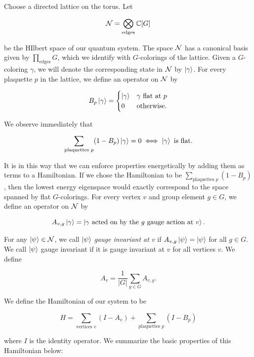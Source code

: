 \documentclass{article}
\theoremstyle{definition}
\numberwithin{figure}{section}
\begin{document}
Choose a directed lattice on the torus. Let

$$\mathcal{N}=\bigotimes_{\text{edges}}\mathbb{C}[G]$$

be the HIlbert space of our quantum system. The space $\mathcal{N}$ has a canonical basis given by $\prod_{\text{edges}}G$, which we  identify with $G$-colorings of the lattice. Given a $G$-coloring $\gamma$, we will denote the corresponding state in $\mathcal{N}$ by $\ket{\gamma}$. For every plaquette $p$ in the lattice, we define an operator on $\mathcal{N}$ by

$$B_p\ket{\gamma}=
\begin{cases}
\ket{\gamma} & \gamma \text{ flat at }p\\
0 & \text{otherwise}.
\end{cases}$$

We observe immediately that

$$\sum_{\text{plaquettes }p}(1-B_p)\ket{\gamma}=0 \iff \ket{\gamma} \text{ is flat.}$$

It is in this way that we can enforce properties energetically by adding them as terms to a Hamiltonian. If we chose the Hamiltonian to be $\sum_{\text{plaquettes }p}(1-B_p)$, then the lowest energy eigenspace would exactly correspond to the space spanned by flat $G$-colorings. For every vertex $v$ and group element $g\in G$, we define an operator on $\mathcal{N}$ by

$$A_{v,g}\ket{\gamma}=\ket{\gamma \text{ acted on by the $g$ gauge action at $v$}}.$$

For any $\ket{\psi}\in \mathcal{N}$, we call $\ket{\psi}$ \textit{gauge invariant at $v$} if $A_{v,g}\ket{\psi}=\ket{\psi}$ for all $g\in G$. We call $\ket{\psi}$ gauge invariant if it is gauge invariant at $v$ for all vertices $v$. We define

$$A_v=\frac{1}{|G|}\sum_{g\in G}A_{v,g}.$$

We define the Hamiltonian of our system to be

$$H=\sum_{\text{vertices $v$}}(I-A_v)+\sum_{\text{plaquettes $p$}}(I-B_p)$$

where $I$ is the identity operator. We summarize the basic properties of this Hamiltonian below:
\end{document}
